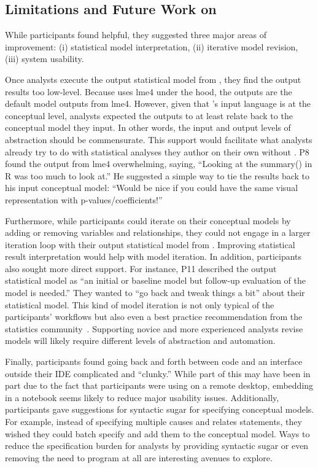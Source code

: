 
\subsection{Limitations and Future Work on \rTisane}
While participants found \rTisane helpful, they suggested three major areas of
improvement: (i) statistical model interpretation, (ii) iterative model
revision, (iii) system usability. 

Once analysts execute the output statistical model from \rTisane, they find the
output results too low-level. Because \rTisane uses lme4 under the hood, the
outputs are the default model outputs from lme4. However, given that \rTisane's
input language is at the conceptual level, analysts expected the outputs to at
least relate back to the conceptual model they input. In other words, the input
and output levels of abstraction should be commensurate. This support would
facilitate what analysts already try to do with statistical analyses they author
on their own without \rTisane. P8 found the output from lme4 overwhelming,
saying, ``Looking at the summary() in R was too much to look at.'' He suggested a
simple way to tie the results back to his input conceptual model: ``Would be nice
if you could have the same visual representation with p-values/coefficients!''

Furthermore, while participants could iterate on their conceptual models by
adding or removing variables and relationships, they could not engage in a
larger iteration loop with their output statistical model from \rTisane.
Improving statistical result interpretation would help with model iteration. In
addition, participants also sought more direct support. For instance, P11
described the \rTisane output statistical model as ``an initial or baseline model
but follow-up evaluation of the model is needed.'' They wanted to ``go back and
tweak things a bit'' about their statistical model. This kind of model iteration
is not only typical of the participants' workflows but also even a best practice
recommendation from the statistics community~\cite{gelman2020modelExpansion}.
Supporting novice and more experienced analysts revise models will likely
require different levels of abstraction and automation. 

Finally, participants found going back and forth between code and an interface
outside their IDE complicated and ``clunky.'' While part of this may have been
in part due to the fact that participants were using \rTisane on a remote
desktop, embedding \rTisane in a notebook seems likely to reduce major usability
issues. Additionally, participants gave suggestions for syntactic sugar for
specifying conceptual models. For example, instead of specifying multiple causes
and relates statements, they wished they could batch specify and add them to the
conceptual model. Ways to reduce the specification burden for analysts by
providing syntactic sugar or even removing the need to program at all are
interesting avenues to explore. 
